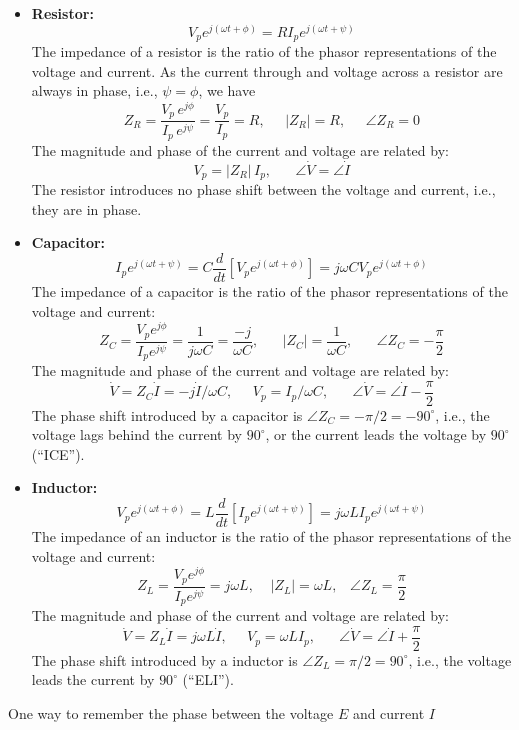 

\begin{itemize}
\item {\bf Resistor:} 
  \[ 
  V_pe^{j(\omega t+\phi)}=R I_pe^{j(\omega t+\psi)}
  \]
  The impedance of a resistor is the ratio of the phasor representations 
  of the voltage and current. As the current through and voltage across
  a resistor are always in phase, i.e., $\psi=\phi$, we have
  \[
  Z_R=\frac{V_p\,e^{j\phi}}{I_p\,e^{j\psi}}
  =\frac{V_p}{I_p}=R, \;\;\;\;\; |Z_R|=R,\;\;\;\;\;\angle Z_R=0
  \]
  The magnitude and phase of the current and voltage are related by:
  \[ 
  V_p=|Z_R|\,I_p,\;\;\;\;\;\; \angle\dot{V}=\angle\dot{I}
  \]
  The resistor introduces no phase shift between the voltage and current,
  i.e., they are in phase.
  
\item {\bf Capacitor:} 
  \[ 
    I_pe^{j(\omega t+\psi)}=C\frac{d}{dt}[V_p e^{j(\omega t+\phi)}]
    =j\omega C V_p e^{j(\omega t+\phi)}
  \]
  The impedance of a capacitor is the ratio of the phasor representations 
  of the voltage and current:
  \[
  Z_C=\frac{V_pe^{j\phi}}{I_pe^{j\psi}}=\frac{1}{j\omega C}=\frac{-j}{\omega C},
  \;\;\;\;\;\;|Z_C|=\frac{1}{\omega C},\;\;\;\;\;\;\angle Z_C=-\frac{\pi}{2}
  \]
  The magnitude and phase of the current and voltage are related by:
  \[
  \dot{V}=Z_C\dot{I}=-j\dot{I}/\omega C,\;\;\;\;\;
  V_p=I_p/\omega C,\;\;\;\;\;\; \angle\dot{V}=\angle\dot{I}-\frac{\pi}{2}
  \]
  The phase shift introduced by a capacitor is $\angle Z_C=-\pi/2=-90^\circ$,
  i.e., the voltage lags behind the current by $90^\circ$, or the current 
  leads the voltage by $90^\circ$ (``ICE'').
  

\item {\bf Inductor:}
  \[
    V_pe^{j(\omega t+\phi)}=L\frac{d}{dt}[I_p e^{j(\omega t+\psi)}]
    =j\omega L I_p e^{j(\omega t+\psi)}
  \]
  The impedance of an inductor is the ratio of the phasor representations 
  of the voltage and current:
  \[ 
  Z_L =\frac{V_pe^{j\phi}}{I_pe^{j\psi}} =j\omega L,
  \;\;\;\;|Z_L|=\omega L,\;\;\;\angle Z_L=\frac{\pi}{2}	
  \]
  The magnitude and phase of the current and voltage are related by:
  \[
  \dot{V}=Z_L\dot{I}=j\omega L\dot{I},\;\;\;\;\;
  V_p=\omega LI_p,\;\;\;\;\;\; \angle\dot{V}=\angle\dot{I}+\frac{\pi}{2}
  \]
  The phase shift introduced by a inductor is $\angle Z_L=\pi/2=90^\circ$,
  i.e., the voltage leads the current by $90^\circ$ (``ELI''). 
\end{itemize}
One way to remember the phase between the voltage $E$ and current $I$ 
